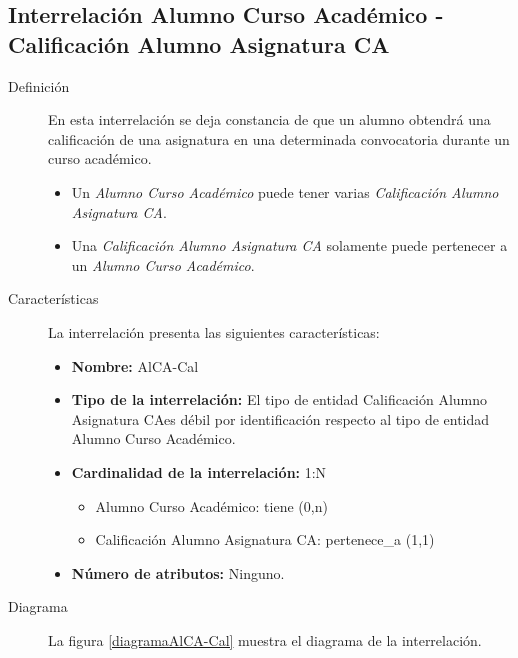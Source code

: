 \subsection{Interrelación Alumno Curso Académico - Calificación Alumno
            Asignatura CA}

   \begin{description}
      \item[Definición] En esta interrelación se deja constancia de que un
      alumno obtendrá una calificación de una asignatura en una determinada
      convocatoria durante un curso académico.

      \begin{itemize}
       \item Un \textit{Alumno Curso Académico} puede tener varias
             \textit{Calificación Alumno Asignatura CA}.
       \item Una \textit{Calificación Alumno Asignatura CA} solamente puede
             pertenecer a un \textit{Alumno Curso Académico}.
      \end{itemize}

      \item[Características] La interrelación presenta las siguientes
                             características:

         \begin{itemize}
            \item \textbf{Nombre:} AlCA-Cal
            \item \textbf{Tipo de la interrelación:} El tipo de entidad
                  Calificación Alumno Asignatura CAes débil por identificación
                  respecto al tipo de entidad Alumno Curso Académico.
            \item \textbf{Cardinalidad de la interrelación:} 1:N
                  \begin{itemize}
                     \item Alumno Curso Académico: tiene (0,n)
                     \item Calificación Alumno Asignatura CA: pertenece\_a (1,1)
                  \end{itemize}
            \item \textbf{Número de atributos:} Ninguno.
         \end{itemize}

      \item[Diagrama] La figura \ref{diagramaAlCA-Cal} muestra el diagrama de la
                      interrelación.


\end{description}
